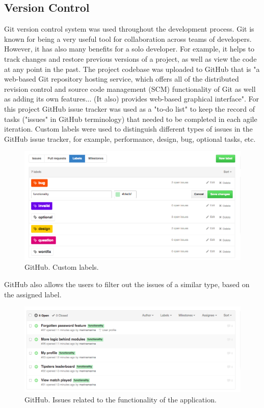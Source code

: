 \subsection{Version Control}
Git version control system was used throughout the development process. Git is known for being a very useful tool for collaboration across teams of developers. However, it has also many benefits for a solo developer. For example, it helps to track changes and restore previous versions of a project, as well as view the code at any point in the past. The project codebase was uploaded to GitHub that is \cite{wiki:GitHub} "a web-based Git repository hosting service, which offers all of the distributed revision control and source code management (SCM) functionality of Git as well as adding its own features... (It also) provides web-based graphical interface". For this project GitHub issue tracker was used as a "to-do list" to keep the record of tasks ("issues" in GitHub terminology) that needed to be completed in each agile iteration. Custom labels were used to distinguish different types of issues in the GitHub issue tracker, for example, performance, design, bug, optional tasks, etc. 

\begin{figure}[H]
	\begin{center}
		\includegraphics[width=.90\linewidth,natwidth=610,natheight=642]{impl/images/githubLabelsChoice}
		\caption{GitHub. Custom labels.} \label{fig:using:githubLabelsChoice}
	\end{center}
\end{figure}

GitHub also allows the users to filter out the issues of a similar type, based on the assigned label.

\begin{figure}[H]
	\begin{center}
		\includegraphics[width=.90\linewidth,natwidth=610,natheight=642]{impl/images/githubFunctionalityIssues}
		\caption{GitHub. Issues related to the functionality of the application.} \label{fig:using:githubFunctionalityIssues}
	\end{center}
\end{figure}

